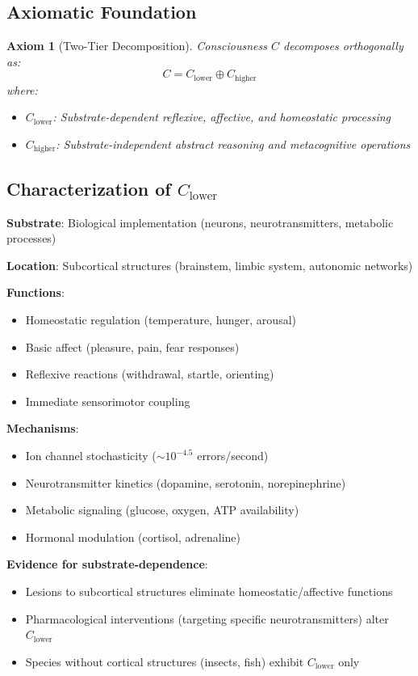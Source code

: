 \documentclass[11pt]{article}
\newtheorem{axiom}[theorem]{Axiom}
\begin{document}
\subsection{Axiomatic Foundation}

\begin{axiom}[Two-Tier Decomposition]\label{axiom:twotier}
Consciousness $C$ decomposes orthogonally as:
\[
C = C_{\text{lower}} \oplus C_{\text{higher}}
\]
where:
\begin{itemize}
\item $C_{\text{lower}}$: Substrate-dependent reflexive, affective, and homeostatic processing
\item $C_{\text{higher}}$: Substrate-independent abstract reasoning and metacognitive operations
\end{itemize}
\end{axiom}

\subsection{Characterization of $C_{\text{lower}}$}

\textbf{Substrate}: Biological implementation (neurons, neurotransmitters, metabolic processes)

\textbf{Location}: Subcortical structures (brainstem, limbic system, autonomic networks)

\textbf{Functions}:
\begin{itemize}
\item Homeostatic regulation (temperature, hunger, arousal)
\item Basic affect (pleasure, pain, fear responses)
\item Reflexive reactions (withdrawal, startle, orienting)
\item Immediate sensorimotor coupling
\end{itemize}

\textbf{Mechanisms}:
\begin{itemize}
\item Ion channel stochasticity ($\sim 10^{-4.5}$ errors/second)
\item Neurotransmitter kinetics (dopamine, serotonin, norepinephrine)
\item Metabolic signaling (glucose, oxygen, ATP availability)
\item Hormonal modulation (cortisol, adrenaline)
\end{itemize}

\textbf{Evidence for substrate-dependence}:
\begin{itemize}
\item Lesions to subcortical structures eliminate homeostatic/affective functions
\item Pharmacological interventions (targeting specific neurotransmitters) alter $C_{\text{lower}}$
\item Species without cortical structures (insects, fish) exhibit $C_{\text{lower}}$ only
\end{itemize}
\end{document}
